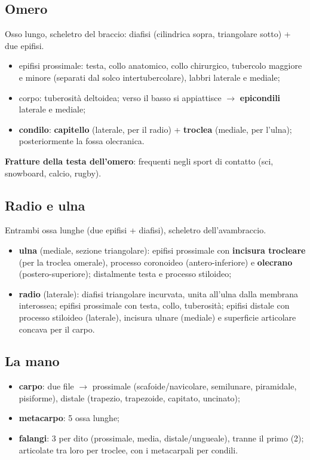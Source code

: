 \subsection{Omero}
Osso lungo, scheletro del braccio: diafisi (cilindrica sopra, triangolare sotto) + due epifisi.
\begin{itemize}
  \item epifisi prossimale: testa, collo anatomico, collo chirurgico, tubercolo maggiore e minore
    (separati dal solco intertubercolare), labbri laterale e mediale;
  \item corpo: tuberosità deltoidea; verso il basso si appiattisce $\rightarrow$ \textbf{epicondili}
    laterale e mediale;
  \item \textbf{condilo}: \textbf{capitello} (laterale, per il radio) + \textbf{troclea} (mediale,
    per l'ulna); posteriormente la fossa olecranica.
\end{itemize}
\textbf{Fratture della testa dell'omero}: frequenti negli sport di contatto (sci, snowboard, calcio,
rugby).

\subsection{Radio e ulna}
Entrambi ossa lunghe (due epifisi + diafisi), scheletro dell'avambraccio.
\begin{itemize}
  \item \textbf{ulna} (mediale, sezione triangolare): epifisi prossimale con \textbf{incisura
    trocleare} (per la troclea omerale), processo coronoideo (antero-inferiore) e \textbf{olecrano}
    (postero-superiore); distalmente testa e processo stiloideo;
  \item \textbf{radio} (laterale): diafisi triangolare incurvata, unita all'ulna dalla membrana
    interossea; epifisi prossimale con testa, collo, tuberosità; epifisi distale con processo
    stiloideo (laterale), incisura ulnare (mediale) e superficie articolare concava per il carpo.
\end{itemize}

\subsection{La mano}
\begin{itemize}
  \item \textbf{carpo}: due file $\rightarrow$ prossimale (scafoide/navicolare, semilunare,
    piramidale, pisiforme), distale (trapezio, trapezoide, capitato, uncinato);
  \item \textbf{metacarpo}: 5 ossa lunghe;
  \item \textbf{falangi}: 3 per dito (prossimale, media, distale/ungueale), tranne il primo (2);
    articolate tra loro per troclee, con i metacarpali per condili.
\end{itemize}

